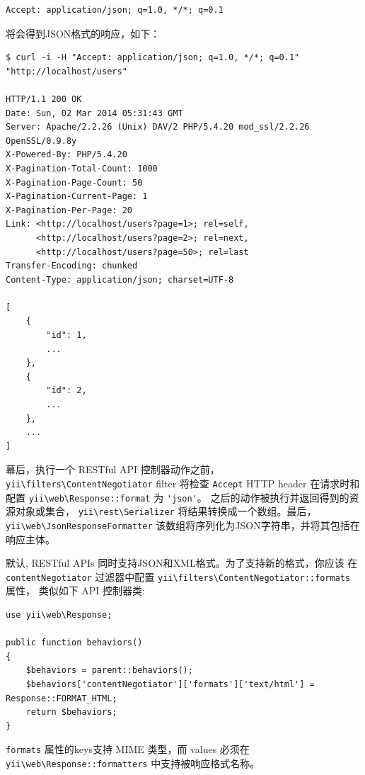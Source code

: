 \begin{lstlisting}
Accept: application/json; q=1.0, */*; q=0.1
\end{lstlisting}
将会得到JSON格式的响应，如下：

\begin{lstlisting}
$ curl -i -H "Accept: application/json; q=1.0, */*; q=0.1" "http://localhost/users"

HTTP/1.1 200 OK
Date: Sun, 02 Mar 2014 05:31:43 GMT
Server: Apache/2.2.26 (Unix) DAV/2 PHP/5.4.20 mod_ssl/2.2.26 OpenSSL/0.9.8y
X-Powered-By: PHP/5.4.20
X-Pagination-Total-Count: 1000
X-Pagination-Page-Count: 50
X-Pagination-Current-Page: 1
X-Pagination-Per-Page: 20
Link: <http://localhost/users?page=1>; rel=self,
      <http://localhost/users?page=2>; rel=next,
      <http://localhost/users?page=50>; rel=last
Transfer-Encoding: chunked
Content-Type: application/json; charset=UTF-8

[
    {
        "id": 1,
        ...
    },
    {
        "id": 2,
        ...
    },
    ...
]
\end{lstlisting}
幕后，执行一个 RESTful API 控制器动作之前，\texttt{yii{\allowbreak{}\textbackslash}filters{\allowbreak{}\textbackslash}ContentNegotiator}
filter 将检查 \lstinline|Accept| HTTP header 在请求时和配置 \texttt{yii{\allowbreak{}\textbackslash}web{\allowbreak{}\textbackslash}Response\allowbreak{}::\allowbreak{}format}
为 \lstinline|'json'|。 之后的动作被执行并返回得到的资源对象或集合，
\texttt{yii{\allowbreak{}\textbackslash}rest{\allowbreak{}\textbackslash}Serializer} 将结果转换成一个数组。最后，\texttt{yii{\allowbreak{}\textbackslash}web{\allowbreak{}\textbackslash}JsonResponseFormatter}
该数组将序列化为JSON字符串，并将其包括在响应主体。

默认, RESTful APIs 同时支持JSON和XML格式。为了支持新的格式，你应该
在 \lstinline|contentNegotiator| 过滤器中配置 \texttt{yii{\allowbreak{}\textbackslash}filters{\allowbreak{}\textbackslash}ContentNegotiator\allowbreak{}::\allowbreak{}formats} 属性，
类似如下 API 控制器类:

\lstset{language=php}\begin{lstlisting}
use yii\web\Response;

public function behaviors()
{
    $behaviors = parent::behaviors();
    $behaviors['contentNegotiator']['formats']['text/html'] = Response::FORMAT_HTML;
    return $behaviors;
}
\end{lstlisting}
\lstinline|formats| 属性的keys支持 MIME 类型，而 values 必须在 \texttt{yii{\allowbreak{}\textbackslash}web{\allowbreak{}\textbackslash}Response\allowbreak{}::\allowbreak{}formatters}
中支持被响应格式名称。

